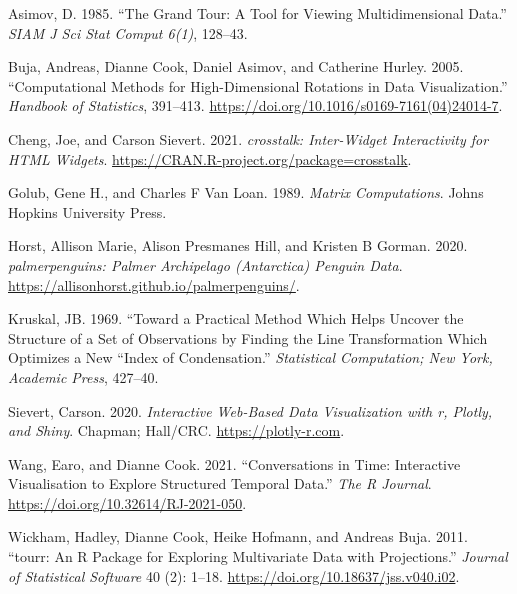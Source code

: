 \hypertarget{refs}{}
\begin{CSLReferences}{1}{0}
\leavevmode{}%
Asimov, D. 1985. {``The Grand Tour: A Tool for Viewing Multidimensional Data.''} \emph{SIAM J Sci Stat Comput 6(1)}, 128--43.

\leavevmode{}%
Buja, Andreas, Dianne Cook, Daniel Asimov, and Catherine Hurley. 2005. {``Computational Methods for High-Dimensional Rotations in Data Visualization.''} \emph{Handbook of Statistics}, 391--413. \url{https://doi.org/10.1016/s0169-7161(04)24014-7}.

\leavevmode{}%
Cheng, Joe, and Carson Sievert. 2021. \emph{{crosstalk}: Inter-Widget Interactivity for HTML Widgets}. \url{https://CRAN.R-project.org/package=crosstalk}.

\leavevmode{}%
Golub, Gene H., and Charles F Van Loan. 1989. \emph{Matrix Computations}. Johns Hopkins University Press.

\leavevmode{}%
Horst, Allison Marie, Alison Presmanes Hill, and Kristen B Gorman. 2020. \emph{{palmerpenguins}: Palmer Archipelago (Antarctica) Penguin Data}. \url{https://allisonhorst.github.io/palmerpenguins/}.

\leavevmode{}%
Kruskal, JB. 1969. {``Toward a Practical Method Which Helps Uncover the Structure of a Set of Observations by Finding the Line Transformation Which Optimizes a New ``Index of Condensation.''} \emph{Statistical Computation; New York, Academic Press}, 427--40.

\leavevmode{}%
Sievert, Carson. 2020. \emph{{Interactive Web-Based Data Visualizatio}n with r, Plotly, and Shiny}. Chapman; Hall/CRC. \url{https://plotly-r.com}.

\leavevmode{}%
Wang, Earo, and Dianne Cook. 2021. {``Conversations in Time: Interactive Visualisation to Explore Structured Temporal Data.''} \emph{The R Journal}. \url{https://doi.org/10.32614/RJ-2021-050}.

\leavevmode{}%
Wickham, Hadley, Dianne Cook, Heike Hofmann, and Andreas Buja. 2011. {``{tourr}: An {R} Package for Exploring Multivariate Data with Projections.''} \emph{Journal of Statistical Software} 40 (2): 1--18. \url{https://doi.org/10.18637/jss.v040.i02}.

\end{CSLReferences}

